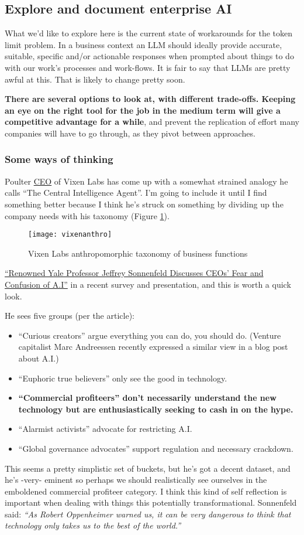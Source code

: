 %

\subsection{Explore and document enterprise AI}
What we'd like to explore here is the current state of workarounds for the token limit problem. In a business context an LLM should ideally provide accurate, suitable, specific and/or actionable responses when prompted about things to do with our work's processes and work-flows. It is fair to say that LLMs are pretty awful at this. That is likely to change pretty soon. \par
\textbf{There are several options to look at, with different trade-offs. Keeping an eye on the right tool for the job in the medium term will give a competitive advantage for a while}, and prevent the replication of effort many companies will have to go through, as they pivot between approaches.
\subsubsection{Some ways of thinking}
Poulter \href{https://twitter.com/jamespoulter}{CEO} of Vixen Labs has come up with a somewhat strained analogy he calls ``The Central Intelligence Agent''. I'm going to include it until I find something better because I think he's struck on something by dividing up the company needs with his taxonomy (Figure \ref{fig:vixenAnthro}).
\begin{figure}[H]
    \centering
    \texttt{[image: vixenanthro]}
    \caption{Vixen Labs anthropomorphic taxonomy of business functions}
    \label{fig:vixenAnthro}
\end{figure}
\href{https://observer.com/2023/06/ceo-ai-survey-yale-professor/}{``Renowned Yale Professor Jeffrey Sonnenfeld Discusses CEOs’ Fear and Confusion of A.I''} in a recent survey and presentation, and this is worth a quick look.\par
He sees five groups (per the article):
\begin{itemize}
\item ``Curious creators'' argue everything you can do, you should do. (Venture capitalist Marc Andreessen recently expressed a similar view in a blog post about A.I.)
\item ``Euphoric true believers'' only see the good in technology.
\item \textbf{``Commercial profiteers'' don’t necessarily understand the new technology but are enthusiastically seeking to cash in on the hype.}
\item ``Alarmist activists'' advocate for restricting A.I.
\item ``Global governance advocates'' support regulation and necessary crackdown.
\end{itemize}
This seems a pretty simplistic set of buckets, but he's got a decent dataset, and he's -very- eminent so perhaps we should realistically see ourselves in the emboldened commercial profiteer category. I think this kind of self reflection is important when dealing with things this potentially transformational. Sonnenfeld said: \textit{``As Robert Oppenheimer warned us, it can be very dangerous to think that technology only takes us to the best of the world.''}
